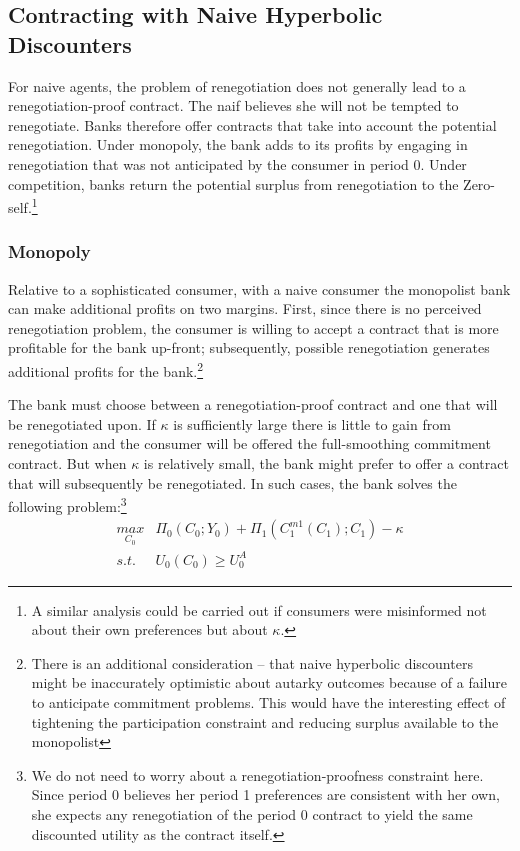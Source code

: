 \documentclass[11pt,english]{article}
\theoremstyle{plain}
\theoremstyle{definition}
\begin{document}
\subsection{Contracting with Naive Hyperbolic Discounters}

For naive agents, the problem of renegotiation does not generally
lead to a renegotiation-proof contract. The naif believes she will
not be tempted to renegotiate. Banks therefore offer contracts that
take into account the potential renegotiation. Under monopoly, the
bank adds to its profits by engaging in renegotiation that was not
anticipated by the consumer in period 0. Under competition, banks
return the potential surplus from renegotiation to the Zero-self.\footnote{A similar analysis could be carried out if consumers were misinformed
not about their own preferences but about $\kappa$.}

\subsubsection{Monopoly}

Relative to a sophisticated consumer, with a naive consumer the monopolist
bank can make additional profits on two margins. First, since there
is no perceived renegotiation problem, the consumer is willing to
accept a contract that is more profitable for the bank up-front; subsequently,
possible renegotiation generates additional profits for the bank.\footnote{There is an additional consideration -- that naive hyperbolic discounters might be inaccurately optimistic about autarky outcomes because of a failure to anticipate commitment problems. This would have the interesting effect of tightening the participation constraint and reducing surplus available to the monopolist}

The bank must choose between a renegotiation-proof contract and one
that will be renegotiated upon. If $\kappa$ is sufficiently large
there is little to gain from renegotiation and the consumer will be
offered the full-smoothing commitment contract. But when $\kappa$
is relatively small, the bank might prefer to offer a contract that
will subsequently be renegotiated. In such cases, the bank solves
the following problem:\footnote{We do not need to worry about a renegotiation-proofness constraint
here. Since period 0 believes her period 1 preferences are consistent
with her own, she expects any renegotiation of the period 0 contract
to yield the same discounted utility as the contract itself.} 
\begin{eqnarray}
\underset{C_{0}}{max} & \Pi_{0}\left(C_{0};Y_{0}\right)+\Pi_{1}\left(C_{1}^{m1}\left(C_{1}\right);C_{1}\right)-\kappa\nonumber \\
s.t. & U_{0}\left(C_{0}\right)\geq U_{0}^{A}\label{eq:pc-n}
\end{eqnarray}
\end{document}
